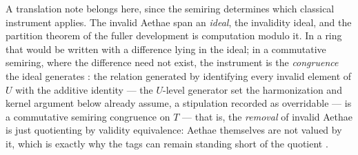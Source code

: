\begin{defin}
\end{defin}

A translation note belongs here, since the semiring determines which classical instrument applies. The invalid Aethae span an \emph{ideal}, the invalidity ideal, and the partition theorem of the fuller development is computation modulo it. In a ring that would be written with a difference lying in the ideal; in a commutative semiring, where the difference need not exist, the instrument is the \emph{congruence} the ideal generates \cite{golan1999semirings}: the relation generated by identifying every invalid element of $U$ with the additive identity --- the $U$-level generator set the harmonization and kernel argument below already assume, a stipulation recorded as overridable --- is a commutative semiring congruence on $T$ --- that is, the \emph{removal} of invalid Aethae is just quotienting by validity equivalence: Aethae themselves are not valued by it, which is exactly why the tags can remain standing short of the quotient .

